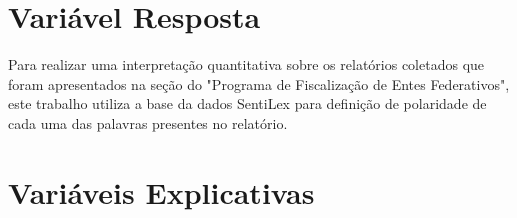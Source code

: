 \section{Variável Resposta}
\label{sec:variavel_resposta}

Para realizar uma interpretação quantitativa sobre os relatórios coletados que foram apresentados na seção do "Programa de Fiscalização de Entes Federativos", este trabalho utiliza a base da dados SentiLex para definição de polaridade de cada uma das palavras presentes no relatório.

\section{Variáveis Explicativas}
\label{sec:variaveis_explicativas}







